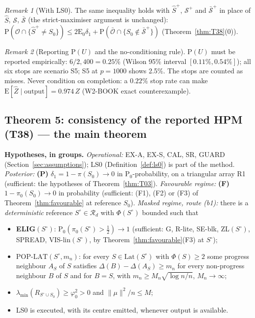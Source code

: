 \documentclass[11pt]{article}
\theoremstyle{definition}
\theoremstyle{remark}
\newtheorem{remark}{Remark}
\renewcommand{\Pr}{\mathrm{P}}
\newcommand{\E}{\mathrm{E}}
\newcommand{\Sz}{S_0}
\newcommand{\Sh}{\widehat S}
\newcommand{\Spl}{\widehat S^{+}}
\newcommand{\Zh}{\widehat Z}
\newcommand{\cS}{\mathcal S}
\newcommand{\cO}{\mathcal O}
\newcommand{\cR}{\mathcal R}
\newcommand{\Lat}{\mathrm{Lat}}
\begin{document}
\begin{remark}[With LS0]\label{rem:T21LS0}
The same inequality holds with $\Spl$, $\cS^+$ and $\bar{\cS}^+$ in place of $\Sh$, $\cS$, $\bar{\cS}$ (the strict-maximiser argument is unchanged):
$\Pr(\cO\cap\{\Spl\ne\Sz\})\le2\E_0\delta_1+\Pr(\bar{\cO}\cap\{\Sz\notin\bar{\cS}^+\})$ (Theorem~\ref{thm:T38}(0)).
\end{remark}

\begin{remark}[Reporting $\Pr(U)$ and the no-conditioning rule]\label{rem:PU}
$\Pr(U)$ must be reported empirically: $6/2{,}400=0.25\%$ (Wilson 95\% interval $[0.11\%,0.54\%]$); all six stops are scenario S5; S5 at $p=1000$ shows
2.5\%. The stops are counted as misses. Never condition on completion: a $0.22\%$ stop rate can make $\E[\Zh\mid\text{output}]=0.974\,Z$ (W2-BOOK exact counterexample).
\end{remark}

\subsection{Theorem 5: consistency of the reported HPM (T38) --- the main theorem}

\noindent\textbf{Hypotheses, in groups.}
\emph{Operational:} EX-A, EX-S, CAL, SR, GUARD (Section~\ref{sec:assumptions}); LS0 (Definition~\ref{def:ls0}) is part of the method.
\emph{Posterior:} \textbf{(P)} $\delta_1=1-\pi(\Sz)\to0$ in $\Pr_0$-probability, on a triangular array R1 (sufficient: the hypotheses of Theorem~\ref{thm:T03}).
\emph{Favourable regime:} \textbf{(F)} $1-\pi_0(\Sz)\to0$ in probability (sufficient: (F1), (F2) or (F3) of Theorem~\ref{thm:favourable} at reference $\Sz$).
\emph{Masked regime, route (b1):} there is a \emph{deterministic} reference $S^\circ\in\cR_d$ with $\Phi(S^\circ)$ bounded such that
\begin{itemize}
\item[(M1)] \textbf{ELIG}$(S^\circ)$: $\Pr_0(\pi_0(S^\circ)>\tfrac12)\to1$ (sufficient: G, R-lite, SE-blk, ZL$(S^\circ)$, SPREAD, VIS-lin$(S^\circ)$, by Theorem~\ref{thm:favourable}(F3) at $S^\circ$);
\item[(M2)] $\mathrm{POP\text{-}LAT}(S^\circ,m_n)$: for every $S\in\Lat(S^\circ)$ with $\Phi(S)\ge2$ some progress neighbour $A_S$ of $S$ satisfies $\Delta(B)-\Delta(A_S)\ge m_n$ for every non-progress neighbour $B$ of $S$ and for $B=S$, with $m_n\ge M_n\sqrt{\log n/n}$, $M_n\to\infty$;
\item[(M3)] $\lambda_{\min}(R_{S^\circ\cup\Sz})\ge\varphi_0^2>0$ and $\|\mu\|^2/n\le M$;
\item[(OP-LS0)] LS0 is executed, with its centre emitted, whenever output is available.
\end{itemize}
\end{document}
